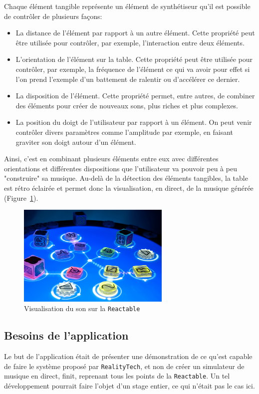 Chaque élément tangible représente un élément de synthétiseur qu'il est possible de contrôler de plusieurs façons:
\begin{itemize} 
\item La distance de l'élément par rapport à un autre élément. Cette propriété peut être utilisée pour contrôler, par exemple, l'interaction entre deux éléments.
\item L'orientation de l'élément sur la table. Cette propriété peut être utilisée pour contrôler, par exemple, la fréquence de l'élément ce qui va avoir pour effet si l'on prend l'exemple d'un battement de ralentir ou d'accélérer ce dernier.
\item La disposition de l'élément. Cette propriété permet, entre autres, de combiner des éléments pour créer de nouveaux sons, plus riches et plus complexes.
\item La position du doigt de l'utilisateur par rapport à un élément. On peut venir contrôler divers paramètres comme l'amplitude par exemple, en faisant graviter son doigt autour d'un élément.
\end{itemize}
Ainsi, c'est en combinant plusieurs éléments entre eux avec différentes orientations et différentes dispositions que l'utilisateur va pouvoir peu à peu "construire" sa musique.
Au-delà de la détection des éléments tangibles, la table est rétro éclairée et permet donc la visualisation, en direct, de la musique générée (Figure~\ref{fig:reactivsu}).

\begin{figure}[H]
\centering
\includegraphics[width=0.65\textwidth]{images/reactvisu}
\caption{Visualisation du son sur la \texttt{Reactable}\protect\footnotemark}
\label{fig:reactivsu}
\end{figure}


\subsection{Besoins de l'application}
\label{subsec:reartable:content}
Le but de l'application était de présenter une démonstration de ce qu'est capable de faire le système proposé par \texttt{RealityTech}, et non de créer un simulateur de musique en direct, finit, reprenant tous les points de la \texttt{Reactable}. Un tel développement pourrait faire l'objet d'un stage entier, ce qui n'était pas le cas ici.\\

